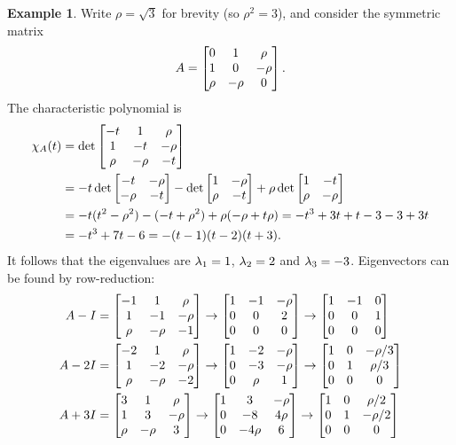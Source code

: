 \documentclass[reqno]{amsart}
\theoremstyle{definition}
\newtheorem{example}[theorem]{Example}
\begin{document}
\begin{example}\label{eg-symmetric-diag-ii}
 Write $\rho=\sqrt{3}$ for brevity (so $\rho^2=3$), and consider the
 symmetric matrix  
 \[ A=\left[\begin{matrix} 0&1&\rho \\ 1&0&-\rho \\ \rho & -\rho & 0\end{matrix}\right]. \]
 The characteristic polynomial is 
 \begin{align*}
  \chi_A(t) 
   &= \det\left[\begin{matrix}   -t &     1 &   \rho \\
                  1 &    -t &  -\rho \\
               \rho & -\rho &     -t
          \end{matrix}\right] \\
   &= -t\det\left[\begin{matrix} -t&-\rho \\ -\rho&-t \end{matrix}\right] 
       -\det\left[\begin{matrix} 1&-\rho \\ \rho&-t\end{matrix}\right] 
   +\rho\det\left[\begin{matrix} 1&-t \\ \rho&-\rho\end{matrix}\right] \\
   &= -t(t^2-\rho^2) - (-t+\rho^2) +\rho(-\rho+t\rho)
    = -t^3 + 3t + t - 3 - 3 +3t \\
   &= -t^3 + 7t - 6 = -(t-1)(t-2)(t+3).
 \end{align*}
 It follows that the eigenvalues are $\lambda_1=1$, $\lambda_2=2$ and
 $\lambda_3=-3$.  Eigenvectors can be found by row-reduction:
 \begin{align*}
  A-I &= 
   \bbm -1&1&\rho \\ 1&-1&-\rho \\ \rho & -\rho & -1\ebm
   \to 
   \bbm 1&-1&-\rho \\ 0 & 0 & 2 \\ 0&0&0 \ebm
   \to 
   \bbm 1&-1&0 \\ 0 & 0 & 1 \\ 0&0&0 \ebm \\
  A-2I &=
   \bbm -2&1&\rho \\ 1&-2&-\rho \\ \rho & -\rho & -2\ebm
   \to 
   \bbm 1&-2&-\rho \\ 0&-3&-\rho \\ 0& \rho & 1 \ebm 
   \to 
   \bbm 1&0&-\rho/3 \\ 0&1&\rho/3 \\ 0& 0 & 0 \ebm \\
  A+3I &= 
   \bbm 3&1&\rho \\ 1&3&-\rho \\ \rho & -\rho & 3\ebm
   \to
   \bbm 1&3&-\rho \\ 0&-8&4\rho \\ 0&-4\rho&6 \ebm
   \to 
   \bbm 1&0&\rho/2 \\ 0&1&-\rho/2 \\ 0&0&0 \ebm

\end{align*}
\end{example}
\end{document}
